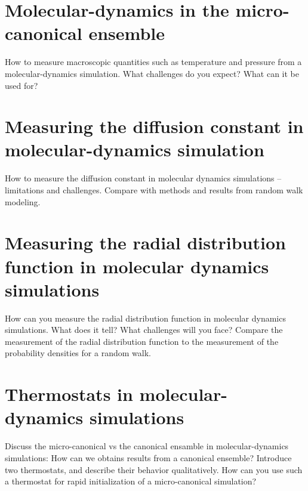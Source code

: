 \documentclass[a4paper, 11pt, notitlepage, english]{article}
\begin{document}
\clearpage



\section{Molecular-dynamics in the micro-canonical ensemble}
How to measure macroscopic quantities such as temperature and pressure from
a molecular-dynamics simulation. What challenges do you expect? What can
it be used for?

\clearpage



\section{Measuring the diffusion constant in molecular-dynamics simulation}
How to measure the diffusion constant in molecular dynamics simulations –
limitations and challenges. Compare with methods and results from random
walk modeling.

\clearpage



\section{Measuring the radial distribution function in molecular dynamics simulations}
How can you measure the radial distribution function in molecular dynamics
simulations. What does it tell? What challenges will you face? Compare
the measurement of the radial distribution function to the measurement of the
probability densities for a random walk.

\clearpage


\section{Thermostats in molecular-dynamics simulations}
Discuss the micro-canonical vs the canonical ensamble in molecular-dynamics
simulations: How can we obtains results from a canonical ensemble? Introduce
two thermostats, and describe their behavior qualitatively. How can you use
such a thermostat for rapid initialization of a micro-canonical simulation?
\end{document}
